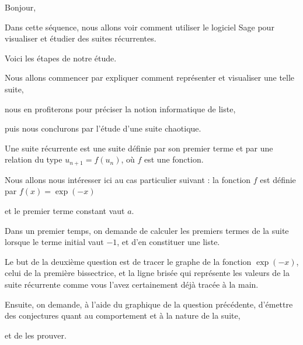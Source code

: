 






\debuttexte


\diapo

Bonjour,

Dans cette séquence, nous allons voir comment utiliser 
le logiciel Sage pour visualiser et étudier des suites récurrentes.

\change
Voici les étapes de notre étude.

\change
Nous allons commencer par expliquer comment représenter et visualiser une telle suite,

\change
nous en profiterons pour préciser la notion informatique de liste, 

\change
puis nous conclurons par l'étude d'une suite chaotique.



\diapo

Une suite récurrente est une suite définie par son premier terme et par une relation du type  $u_{n+1} = f(u_n)$, 
où $f$ est une fonction. 

Nous allons nous intéresser ici au cas particulier suivant : la fonction $f$ est définie par $f(x)=\exp(-x)$

et le premier terme constant vaut $a$.

\change

Dans un premier temps, on demande de calculer 
 les premiers termes de la suite lorsque le terme initial vaut $-1$, 
 et d'en constituer une liste.

\change

Le but de la deuxième question est de tracer le graphe de la fonction $\exp(-x)$, 
celui de la première bissectrice, et la ligne brisée qui représente les valeurs de la suite récurrente 
comme vous l'avez certainement déjà tracée à la main.

\change

Ensuite, on demande, à l'aide du graphique de la question précédente, 
d'émettre des conjectures quant au comportement et à la nature de la suite,

\change

et de les prouver.


\diapo

